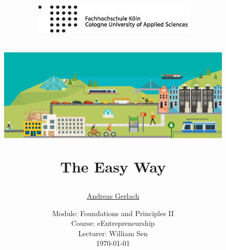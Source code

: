 \documentclass[a4paper]{article}
\begin{document}
	\title{
	\begin{figure}[!ht]
		\flushleft
			\includegraphics[width=0.7\textwidth]{logo.eps}
	\end{figure}
	\vspace{1cm}
	\begin{figure}[!ht]
	    \includegraphics[width=\textwidth]{Connected_commuters_SSpage.png}
	\end{figure}
	\vspace{1cm}
	\Huge The Easy Way \\
	}
	
	\vspace{1cm}
	
	
	\author{\Large \href{mailto:andreas.gerlach@smail.fh-koeln.de}{Andreas Gerlach}
	\vspace{1cm}}
	
	\date{
	\large Module: Foundations and Principles II \\ Course: eEntrepreneurship \\ 
	\vspace{0.8cm}
	\large Lecturer: William Sen \\
	\vspace{1cm}
	\today
	}

	\maketitle
	\setlength{\parindent}{0pt}

	\newpage
	\tableofcontents
	\newpage
	\listoffigures
	\vspace{2cm}
	\listoftables
	\newpage
	
\end{document}
